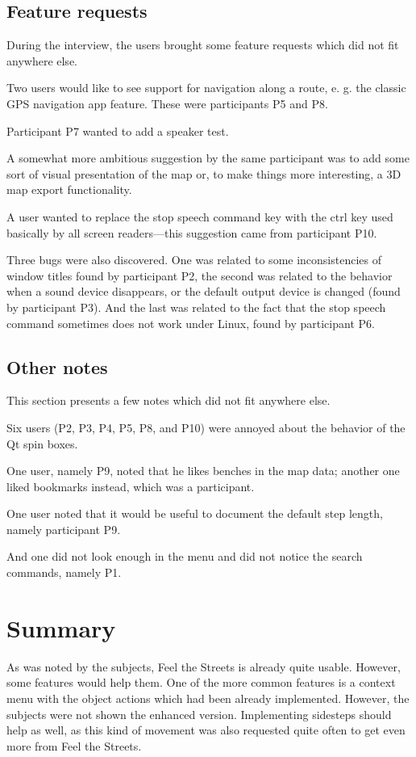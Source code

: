 \documentclass[nolof,digital]{fithesis3}
\begin{document}
\subsection{Feature requests}
During the interview, the users brought some feature requests which did not fit anywhere else.

Two users would like to see support for navigation along a route, e. g. the classic GPS navigation app feature. These were participants P5 and P8.

Participant P7 wanted to add a speaker test.

A somewhat more ambitious suggestion by the same participant was to add some sort of visual presentation of the map or, to make things more interesting, a 3D map export functionality.

A user wanted to replace the stop speech command key with the ctrl key used basically by all screen readers—this suggestion came from participant P10.

Three bugs were also discovered. One was related to some inconsistencies of window titles found by participant P2, the second was related to the behavior when a sound device disappears, or the default output device is changed (found by participant P3). And the last was related to the fact that the stop speech command sometimes does not work under Linux, found by participant P6.
\subsection{Other notes}
This section presents a few notes which did not fit anywhere else.

Six users (P2, P3, P4, P5, P8, and P10) were annoyed about the behavior of the Qt spin boxes.

One user, namely P9, noted that he likes benches in the map data; another one liked bookmarks instead, which was a participant.

One user noted that it would be useful to document the default step length, namely participant P9.

And one did not look enough in the menu and did not notice the search commands, namely P1.
\section{Summary}
As was noted by the subjects, Feel the Streets is already quite usable. However, some features would help them. One of the more common features is a context menu with the object actions which had been already implemented. However, the subjects were not shown the enhanced version. Implementing sidesteps should help as well, as this kind of movement was also requested quite often to get even more from Feel the Streets.
\end{document}
